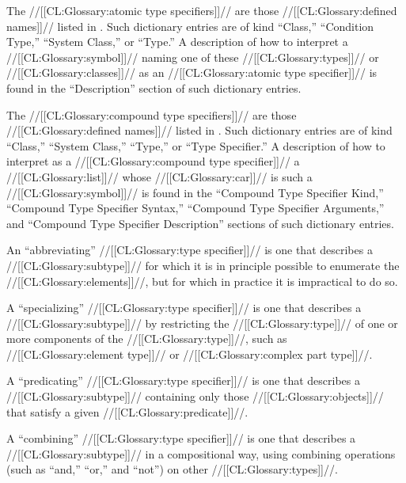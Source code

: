 
The //[[CL:Glossary:atomic type specifiers]]// are those //[[CL:Glossary:defined names]]// 
listed in \figref\StandardizedAtomicTypeSpecs.
Such dictionary entries are of kind 
``Class,'' ``Condition Type,'' ``System Class,'' or ``Type.''
A description of how to interpret 
a //[[CL:Glossary:symbol]]// naming one of these //[[CL:Glossary:types]]// or //[[CL:Glossary:classes]]// 
as an //[[CL:Glossary:atomic type specifier]]//
is found in the ``Description'' section of such dictionary entries.

The //[[CL:Glossary:compound type specifiers]]// are those //[[CL:Glossary:defined names]]// 
listed in \figref\StandardizedCompoundTypeSpecNames.
Such dictionary entries are of kind ``Class,'' ``System Class,''
``Type,'' or ``Type Specifier.''
A description of how to interpret as a //[[CL:Glossary:compound type specifier]]//
a //[[CL:Glossary:list]]// whose //[[CL:Glossary:car]]// is such a //[[CL:Glossary:symbol]]//
is found in the 
     ``Compound Type Specifier Kind,''
     ``Compound Type Specifier Syntax,''
     ``Compound Type Specifier Arguments,''
 and ``Compound Type Specifier Description''
sections of such dictionary entries.


An ``abbreviating'' //[[CL:Glossary:type specifier]]// is one that describes a //[[CL:Glossary:subtype]]//
for which it is in principle possible to enumerate the //[[CL:Glossary:elements]]//,
but for which in practice it is impractical to do so.

A ``specializing'' //[[CL:Glossary:type specifier]]// is one that describes a //[[CL:Glossary:subtype]]//
by restricting the //[[CL:Glossary:type]]// of one or more components of the //[[CL:Glossary:type]]//,
such as //[[CL:Glossary:element type]]// or //[[CL:Glossary:complex part type]]//.

A ``predicating'' //[[CL:Glossary:type specifier]]// is one that describes a //[[CL:Glossary:subtype]]//
containing only those //[[CL:Glossary:objects]]// that satisfy a given //[[CL:Glossary:predicate]]//.

A ``combining'' //[[CL:Glossary:type specifier]]// is one that describes a //[[CL:Glossary:subtype]]//
in a compositional way, using combining operations (such as ``and,'' ``or,'' and
``not'') on other //[[CL:Glossary:types]]//.

